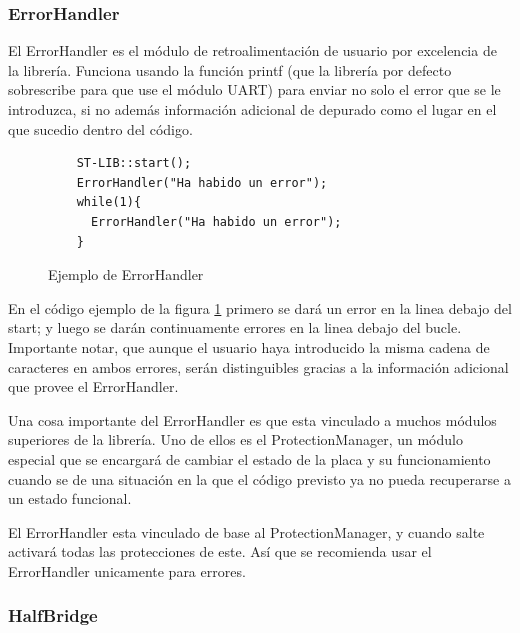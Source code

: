 \documentclass{report}
\begin{document}
\subsubsection{ErrorHandler}
El ErrorHandler es el módulo de retroalimentación de usuario por excelencia de la librería. Funciona usando la función printf (que la librería por defecto sobrescribe para que use el módulo UART) para enviar no solo el error que se le introduzca, si no además información adicional de depurado como el lugar en el que sucedio dentro del código. 
\begin{figure}[h]
  \begin{lstlisting}
    ST-LIB::start();
    ErrorHandler("Ha habido un error");
    while(1){
      ErrorHandler("Ha habido un error");
    }
  \end{lstlisting}
  \caption{Ejemplo de ErrorHandler}
  \label{ErrorHandlerCode}
\end{figure}
En el código ejemplo de la figura \ref{ErrorHandlerCode} primero se dará un error en la linea debajo del start; y luego se darán continuamente errores en la linea debajo del bucle. Importante notar, que aunque el usuario haya introducido la misma cadena de caracteres en ambos errores, serán distinguibles gracias a la información adicional que provee el ErrorHandler. 
\par \vspace{0.3cm}
Una cosa importante del ErrorHandler es que esta vinculado a muchos módulos superiores de la librería. Uno de ellos es el ProtectionManager, un módulo especial que se encargará de cambiar el estado de la placa y su funcionamiento cuando se de una situación en la que el código previsto ya no pueda recuperarse a un estado funcional. 
\par
El ErrorHandler esta vinculado de base al ProtectionManager, y cuando salte activará todas las protecciones de este. Así que se recomienda usar el ErrorHandler unicamente para errores. 

\subsubsection{HalfBridge}
\end{document}
